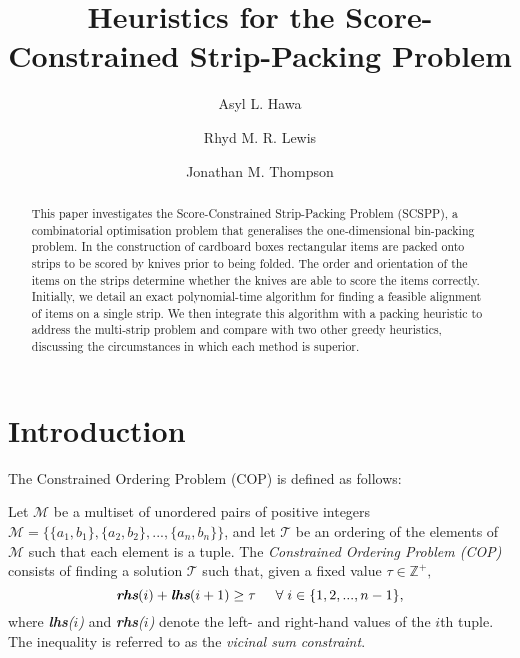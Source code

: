 \documentclass[runningheads]{llncs}
\begin{document}
	
\title{Heuristics for the Score-Constrained Strip-Packing Problem}
\author{Asyl L. Hawa \and Rhyd M. R. Lewis \and Jonathan M. Thompson}
\maketitle

\begin{abstract}
	This paper investigates the Score-Constrained Strip-Packing Problem (SCSPP), a combinatorial optimisation problem that generalises the one-dimensional bin-packing problem. In the construction of cardboard boxes rectangular items are packed onto strips to be scored by knives prior to being folded. The order and orientation of the items on the strips determine whether the knives are able to score the items correctly. Initially, we detail an exact polynomial-time algorithm for finding a feasible alignment of items on a single strip. We then integrate this algorithm with a packing heuristic to address the multi-strip problem and compare with two other greedy heuristics, discussing the circumstances in which each method is superior.
\end{abstract}

\section{Introduction}
\label{sec:intro}
The Constrained Ordering Problem (COP) is defined as follows:

\begin{definition}
	\label{defn:cop}
	Let $\mathcal{M}$ be a multiset of unordered pairs of positive integers $\mathcal{M} = \{\{a_1, b_1\}, \{a_2,b_2\},...,\{a_n,b_n\}\}$, and let $\mathcal{T}$ be an ordering of the elements of $\mathcal{M}$ such that each element is a tuple. The \emph{Constrained Ordering Problem (COP)} consists of finding a solution $\mathcal{T}$ such that, given a fixed value $\tau \in \mathbb{Z}^{+},$
	\begin{equation}
		\label{eqn:vsc}
		\emph{\textbf{rhs}}(i) + \emph{\textbf{lhs}}(i+1) \geq \tau \hspace{5mm} \forall \hspace{1mm} i \in \{1,2,..., n-1\},
	\end{equation}
	where \emph{\textbf{lhs}($i$)} and \emph{\textbf{rhs}($i$)} denote the left- and right-hand values of the $i$th tuple. The inequality is referred to as the \emph{vicinal sum constraint}.
\end{definition}
\end{document}

